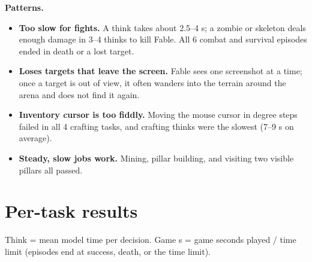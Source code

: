\documentclass[10pt]{article}
\begin{document}
\textbf{Patterns.}
\begin{itemize}\itemsep0pt
\item \textbf{Too slow for fights.} A think takes about 2.5--4 s; a zombie or skeleton deals enough damage in 3--4 thinks to kill Fable. All 6 combat and survival episodes ended in death or a lost target.
\item \textbf{Loses targets that leave the screen.} Fable sees one screenshot at a time; once a target is out of view, it often wanders into the terrain around the arena and does not find it again.
\item \textbf{Inventory cursor is too fiddly.} Moving the mouse cursor in degree steps failed in all 4 crafting tasks, and crafting thinks were the slowest (7--9 s on average).
\item \textbf{Steady, slow jobs work.} Mining, pillar building, and visiting two visible pillars all passed.
\end{itemize}

\clearpage
\section*{Per-task results}
Think = mean model time per decision. Game s = game seconds played / time limit (episodes end at success, death, or the time limit).
\end{document}

